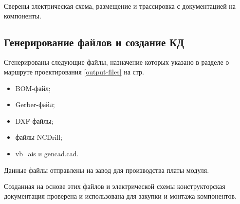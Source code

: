 Сверены электрическая схема, размещение и трассировка с документацией на компоненты. 

\subsection{Генерирование файлов и создание КД}

Сгенерированы следующие файлы, назначение которых указано в разделе о маршруте проектирования \ref{output-files} на стр. \pageref{output-files}
\begin{itemize}
	\item BOM-файл;
	\item Gerber-файл;
	\item DXF-файлы;
	\item файлы NCDrill;
	\item vb\_ais и gencad.cad.
\end{itemize}

Данные файлы отправлены на завод для производства платы модуля.

Созданная на основе этих файлов и электрической схемы конструкторская документация проверена и использована для закупки и монтажа компонентов.


\clearpage
